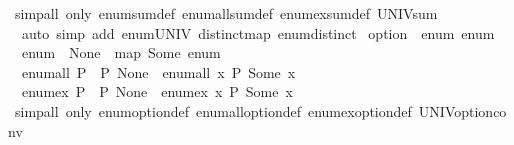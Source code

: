 \begin{isabellebody}
%
\isatagproof
{}\isamarkupfalse%
\isanewline
{}\isamarkupfalse%
\ {\isacharparenleft}{\kern0pt}simp{\isacharunderscore}{\kern0pt}all\ only{\isacharcolon}{\kern0pt}\ enum{\isacharunderscore}{\kern0pt}sum{\isacharunderscore}{\kern0pt}def\ enum{\isacharunderscore}{\kern0pt}all{\isacharunderscore}{\kern0pt}sum{\isacharunderscore}{\kern0pt}def\ enum{\isacharunderscore}{\kern0pt}ex{\isacharunderscore}{\kern0pt}sum{\isacharunderscore}{\kern0pt}def\ UNIV{\isacharunderscore}{\kern0pt}sum{\isacharcomma}{\kern0pt}\isanewline
\ \ auto\ simp\ add{\isacharcolon}{\kern0pt}\ enum{\isacharunderscore}{\kern0pt}UNIV\ distinct{\isacharunderscore}{\kern0pt}map\ enum{\isacharunderscore}{\kern0pt}distinct{\isacharparenright}{\kern0pt}%
\endisatagproof
{\isafoldproof}%
%
\isadelimproof
%
\endisadelimproof
\isanewline
\isanewline
{}\isamarkupfalse%
\isanewline
\isanewline
{}\isamarkupfalse%
\ option\ {\isacharcolon}{\kern0pt}{\isacharcolon}{\kern0pt}\ {\isacharparenleft}{\kern0pt}enum{\isacharparenright}{\kern0pt}\ enum\isanewline
{}\isanewline
\isanewline
{}\isamarkupfalse%
\isanewline
\ \ {\isachardoublequoteopen}enum\ {\isacharequal}{\kern0pt}\ None\ {\isacharhash}{\kern0pt}\ map\ Some\ enum{\isachardoublequoteclose}\isanewline
\isanewline
{}\isamarkupfalse%
\isanewline
\ \ {\isachardoublequoteopen}enum{\isacharunderscore}{\kern0pt}all\ P\ {\isasymlongleftrightarrow}\ P\ None\ {\isasymand}\ enum{\isacharunderscore}{\kern0pt}all\ {\isacharparenleft}{\kern0pt}{\isasymlambda}x{\isachardot}{\kern0pt}\ P\ {\isacharparenleft}{\kern0pt}Some\ x{\isacharparenright}{\kern0pt}{\isacharparenright}{\kern0pt}{\isachardoublequoteclose}\isanewline
\isanewline
{}\isamarkupfalse%
\isanewline
\ \ {\isachardoublequoteopen}enum{\isacharunderscore}{\kern0pt}ex\ P\ {\isasymlongleftrightarrow}\ P\ None\ {\isasymor}\ enum{\isacharunderscore}{\kern0pt}ex\ {\isacharparenleft}{\kern0pt}{\isasymlambda}x{\isachardot}{\kern0pt}\ P\ {\isacharparenleft}{\kern0pt}Some\ x{\isacharparenright}{\kern0pt}{\isacharparenright}{\kern0pt}{\isachardoublequoteclose}\isanewline
\isanewline
{}\isamarkupfalse%
%
\isadelimproof
\ %
\endisadelimproof
%
\isatagproof
{}\isamarkupfalse%
\isanewline
{}\isamarkupfalse%
\ {\isacharparenleft}{\kern0pt}simp{\isacharunderscore}{\kern0pt}all\ only{\isacharcolon}{\kern0pt}\ enum{\isacharunderscore}{\kern0pt}option{\isacharunderscore}{\kern0pt}def\ enum{\isacharunderscore}{\kern0pt}all{\isacharunderscore}{\kern0pt}option{\isacharunderscore}{\kern0pt}def\ enum{\isacharunderscore}{\kern0pt}ex{\isacharunderscore}{\kern0pt}option{\isacharunderscore}{\kern0pt}def\ UNIV{\isacharunderscore}{\kern0pt}option{\isacharunderscore}{\kern0pt}conv{\isacharcomma}{\kern0pt}\isanewline

\end{isabellebody}
